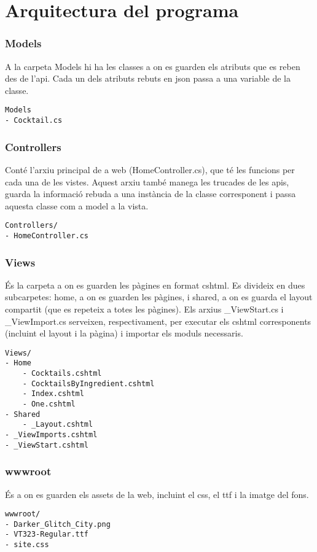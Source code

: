 \section{Arquitectura del programa}

\subsubsection{Models}
A la carpeta Models hi ha les classes a on es guarden
els atributs que es reben des de l'api.
Cada un dels atributs rebuts en json
passa a una variable de la classe.

\begin{verbatim}
Models
- Cocktail.cs
\end{verbatim}

\subsubsection{Controllers}
Cont\'e l'arxiu principal de a web (HomeController.cs),
que t\'e les funcions per cada una de les vistes.
Aquest arxiu tamb\'e manega les trucades de les apis,
guarda la informaci\'o rebuda a una inst\`ancia de la classe corresponent
i passa aquesta classe com a model a la vista.

\begin{verbatim}
Controllers/
- HomeController.cs
\end{verbatim}


\subsubsection{Views}
\'Es la carpeta a on es guarden les p\`agines en format cshtml.
Es divideix en dues subcarpetes: home, a on es guarden les p\`agines,
i shared, a on es guarda el layout compartit (que es repeteix a totes les p\`agines).
Els arxius \_ViewStart.cs i \_ViewImport.cs serveixen, respectivament,
per executar els cshtml corresponents (incluint el layout i la p\`agina)
i importar els moduls necessaris.

\begin{verbatim}
Views/
- Home
    - Cocktails.cshtml
    - CocktailsByIngredient.cshtml
    - Index.cshtml
    - One.cshtml
- Shared
    - _Layout.cshtml
- _ViewImports.cshtml
- _ViewStart.cshtml
\end{verbatim}


\subsubsection{wwwroot}
\'Es a on es guarden els assets de la web,
incluint el css, el ttf i la imatge del fons.

\begin{verbatim}
wwwroot/
- Darker_Glitch_City.png
- VT323-Regular.ttf
- site.css
\end{verbatim}
